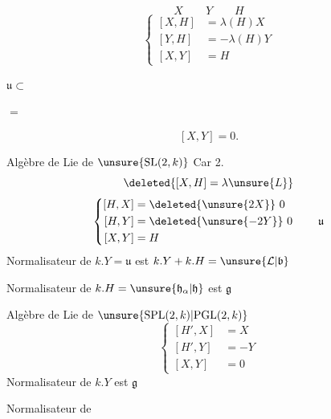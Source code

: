 \[
X\qquad Y\qquad H
\]
\[
\left\{\begin{aligned}
[X,H]&=\lambda(H)X\\
[Y,H]&=-\lambda(H)Y\\
[X,Y]&=H
\end{aligned}\right.
\]

\deleted{$[X,H]$}\qquad $\mathfrak u\subset$


   $=$ 

\[
[X,Y]=0.
\]

Algèbre de Lie de $\unsure{\mathrm{SL}(2,k)}$ \hfill Car 2.
\[
\deleted{[X,H]=\lambda\unsure{L}}
\]
\[
\left\{\begin{aligned}
[H,X]&=\deleted{\unsure{2X}}\ 0\\
[H,Y]&=\deleted{\unsure{-2Y}}\ 0\\
[X,Y]&=H
\end{aligned}\right.
\qquad\mathfrak u
\]
Normalisateur de $k.Y=\mathfrak u$ est $k.Y+k.H=\unsure{\mathcal L|\mathfrak b}$

Normalisateur de $k.H=\unsure{\mathfrak h_\alpha|\mathfrak h}$ est $\mathfrak g$ 

Algèbre de Lie de $\unsure{\mathrm{SPL}(2,k)|\mathrm{PGL}(2,k)}$
\[
\left\{\begin{aligned}
[H',X]&=X\\
[H',Y]&=-Y\\
[X,Y]&=0
\end{aligned}\right.
\]
Normalisateur de $k.Y$ est $\mathfrak g$

Normalisateur de
